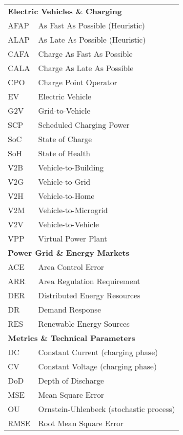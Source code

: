\begin{longtable}{ll}
\multicolumn{2}{l}{\textbf{Electric Vehicles \& Charging}} \\
AFAP & As Fast As Possible (Heuristic) \\
ALAP & As Late As Possible (Heuristic) \\
CAFA & Charge As Fast As Possible \\
CALA & Charge As Late As Possible \\
CPO & Charge Point Operator \\
EV & Electric Vehicle \\
G2V & Grid-to-Vehicle \\
SCP & Scheduled Charging Power \\
SoC & State of Charge \\
SoH & State of Health \\
V2B & Vehicle-to-Building \\
V2G & Vehicle-to-Grid \\
V2H & Vehicle-to-Home \\
V2M & Vehicle-to-Microgrid \\
V2V & Vehicle-to-Vehicle \\
VPP & Virtual Power Plant \\
\hline

\multicolumn{2}{l}{\textbf{Power Grid \& Energy Markets}} \\
ACE & Area Control Error \\
ARR & Area Regulation Requirement \\
DER & Distributed Energy Resources \\
DR & Demand Response \\
RES & Renewable Energy Sources \\
\hline

\multicolumn{2}{l}{\textbf{Metrics \& Technical Parameters}} \\
DC & Constant Current (charging phase) \\
CV & Constant Voltage (charging phase) \\
DoD & Depth of Discharge \\
MSE & Mean Square Error \\
OU & Ornstein-Uhlenbeck (stochastic process) \\
RMSE & Root Mean Square Error \\

\end{longtable}

